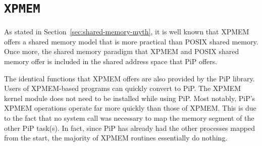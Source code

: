 
\section{{\tt XPMEM}}\label{sec:xpmem}

As stated in Section~\ref{sec:shared-memory-myth}, it is well known
that XPMEM offers a shared memory model that is more practical than
POSIX shared memory. Once more, the shared memory paradigm that XPMEM
and POSIX shared memory offer is included in the shared address space
that PiP offers. 

The identical functions that XPMEM offers are also provided by the PiP
library. Users of XPMEM-based programs can quickly convert to PiP. The
XPMEM kernel module does not need to be installed while using
PiP. Most notably, PiP's XPMEM operations operate far more quickly
than those of XPMEM. This is due to the fact that no system call was
necessary to map the memory segment of the other PiP task(s). In
fact, since PiP has already had the other processes mapped from the
start, the majority of XPMEM routines essentially do nothing.
